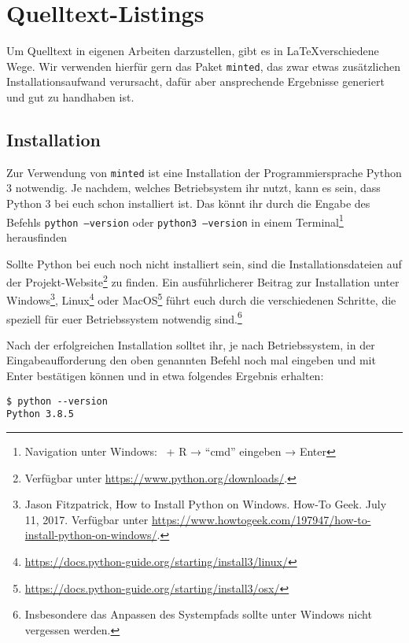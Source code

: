 \section{Quelltext-Listings}
\label{sec:source-code-listings}

Um Quelltext in eigenen Arbeiten darzustellen, gibt es in \LaTeX verschiedene Wege.
Wir verwenden hierfür gern das Paket \texttt{minted}, das zwar etwas zusätzlichen Installationsaufwand verursacht, dafür aber ansprechende Ergebnisse generiert und gut zu handhaben ist.

\subsection{Installation}
Zur Verwendung von \texttt{minted} ist eine Installation der Programmiersprache Python 3 notwendig. Je nachdem, welches Betriebsystem ihr nutzt, kann es sein, dass Python 3 bei euch schon installiert ist. Das könnt ihr durch die Engabe des Befehls \texttt{python --version} oder \texttt{python3 --version} in einem Terminal\footnote{Navigation unter Windows: \faWindows\ + R → \enquote{cmd} eingeben → Enter} herausfinden 

Sollte Python bei euch  noch nicht installiert sein, sind die Installationsdateien auf der Projekt-Website\footnote{Verfügbar unter \url{https://www.python.org/downloads/}.} zu finden.
Ein ausführlicherer Beitrag zur Installation unter Windows\footnote{Jason Fitzpatrick, How to Install Python on Windows. How-To Geek. July 11, 2017. Verfügbar unter \url{https://www.howtogeek.com/197947/how-to-install-python-on-windows/}.}, Linux\footnote{ \url{https://docs.python-guide.org/starting/install3/linux/}} oder MacOS\footnote{\url{https://docs.python-guide.org/starting/install3/osx/}} führt euch durch die verschiedenen Schritte, die speziell für euer Betriebssystem notwendig sind.\footnote{Insbesondere das Anpassen des Systempfads sollte unter Windows nicht vergessen werden.}

Nach der erfolgreichen Installation solltet ihr, je nach Betriebssystem, in der Eingabeaufforderung den oben genannten Befehl noch mal eingeben und mit Enter bestätigen können und in etwa folgendes Ergebnis erhalten:

\begin{verbatim}
$ python --version
Python 3.8.5
\end{verbatim}


